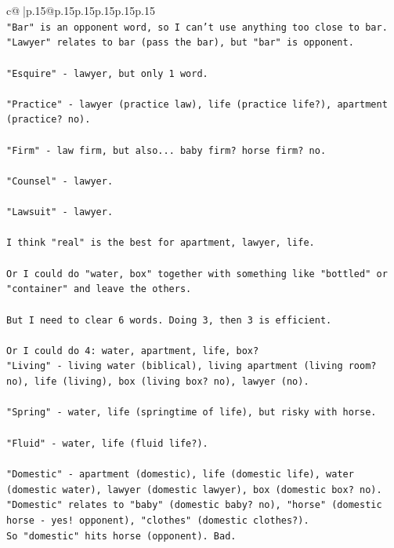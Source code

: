 \documentclass{article}
\begin{document}
{\begin{supertabular}{c@{$\;$}|p{.15\linewidth}@{}p{.15\linewidth}p{.15\linewidth}p{.15\linewidth}p{.15\linewidth}p{.15\linewidth}}
{{{\\ 
\texttt{"Bar" is an opponent word, so I can't use anything too close to bar.} \\
\texttt{"Lawyer" relates to bar (pass the bar), but "bar" is opponent.} \\
\\ 
\texttt{"Esquire" {-} lawyer, but only 1 word.} \\
\\ 
\texttt{"Practice" {-} lawyer (practice law), life (practice life?), apartment (practice? no).} \\
\\ 
\texttt{"Firm" {-} law firm, but also... baby firm? horse firm? no.} \\
\\ 
\texttt{"Counsel" {-} lawyer.} \\
\\ 
\texttt{"Lawsuit" {-} lawyer.} \\
\\ 
\texttt{I think "real" is the best for apartment, lawyer, life.} \\
\\ 
\texttt{Or I could do "water, box" together with something like "bottled" or "container" and leave the others.} \\
\\ 
\texttt{But I need to clear 6 words. Doing 3, then 3 is efficient.} \\
\\ 
\texttt{Or I could do 4: water, apartment, life, box?} \\
\texttt{"Living" {-} living water (biblical), living apartment (living room? no), life (living), box (living box? no), lawyer (no).} \\
\\ 
\texttt{"Spring" {-} water, life (springtime of life), but risky with horse.} \\
\\ 
\texttt{"Fluid" {-} water, life (fluid life?).} \\
\\ 
\texttt{"Domestic" {-} apartment (domestic), life (domestic life), water (domestic water), lawyer (domestic lawyer), box (domestic box? no).} \\
\texttt{"Domestic" relates to "baby" (domestic baby? no), "horse" (domestic horse {-} yes! opponent), "clothes" (domestic clothes?).} \\
\texttt{So "domestic" hits horse (opponent). Bad.} \\
}}}
\end{supertabular}}
\end{document}
